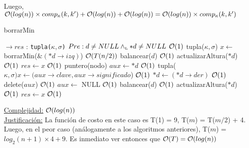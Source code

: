 \begin{Algoritmos}
\begin{algorithm}
Luego, $\mathcal{O}(log(n)) \times comp_{\kappa}(k, k') + \mathcal{O}(log(n)) + \mathcal{O}(log(n)) = \mathcal{O}(log(n)) \times comp_{\kappa}(k, k')$  
\end{algorithm}

\begin{algorithm}
\caption{borrarMin}
\begin{algorithmic}[1]
$\to res$ : \texttt{tupla($\kappa, \sigma$)}
	\State \Comment $Pre: d \neq NULL \land_{\mathrm{\scriptscriptstyle{L}}} *d \neq NULL$
	\Comment $\mathcal{O}(1)$
		\State tupla($\kappa, \sigma$) $x\gets$ borrarMin($\&(*d\to izq)$)
		\Comment $\mathcal{O}(T(n/2))$
		\State balancear($d$)
		\Comment $\mathcal{O}(1)$
		\State actualizarAltura($*d$)
		\Comment $\mathcal{O}(1)$
		\State $res \gets x$
		\Comment $\mathcal{O}(1)$
	\Else
		\State puntero(nodo) $aux \gets *d$
		\Comment $\mathcal{O}(1)$
		\State tupla($\kappa, \sigma) x \gets (aux\to clave, aux\to significado$)
		\Comment $\mathcal{O}(1)$
		\State $*d\gets (*d\to der)$
		\Comment $\mathcal{O}(1)$
		\State delete($aux$)
		\Comment $\mathcal{O}(1)$
		\State $aux \gets$ NULL
		\Comment $\mathcal{O}(1)$
		\State balancear($d$)
		\Comment $\mathcal{O}(1)$
		\State actualizarAltura($*d$)
		\Comment $\mathcal{O}(1)$
		\State $res \gets x$
		\Comment $\mathcal{O}(1)$
	\EndIf
\EndProcedure
\end{algorithmic}
	\underline{Complejidad:} $\mathcal{O}(log(n))$ \\
	\underline{Justificación:} La función de costo en este caso es T(1) = 9, T($m$) = T($m/2$) + 4. Luego, en el peor caso (análogamente a los algoritmos anteriores), T($m$) = $log_2(n + 1) \times 4 + 9$. Es inmediato ver entonces que $\mathcal{O}(T) = \mathcal{O}(log(n))$
\end{algorithm}

\end{Algoritmos}
